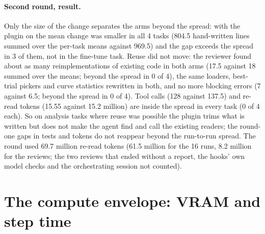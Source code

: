 \documentclass[11pt]{article}
\begin{document}
\paragraph{Second round, result.} Only the size of the change separates the arms beyond the spread: with the plugin on
the mean change was smaller in all 4 tasks (804.5 hand-written lines summed over the per-task means against 969.5) and
the gap exceeds the spread in 3 of them, not in the fine-tune task. Reuse did not move: the reviewer found about as many
reimplementations of existing code in both arms (17.5 against 18 summed over the means; beyond the spread in 0 of 4),
the same loaders, best-trial pickers and curve statistics rewritten in both, and no more blocking errors (7 against
6.5; beyond the spread in 0 of 4). Tool calls (128 against 137.5) and re-read tokens (15.55 against 15.2 million) are
inside the spread in every task (0 of 4 each). So on analysis tasks where reuse was possible the plugin trims what is
written but does not make the agent find and call the existing readers; the round-one gaps in tests and tokens do not
reappear beyond the run-to-run spread. The round used 69.7 million re-read tokens (61.5 million for the 16 runs, 8.2
million for the reviews; the two reviews that ended without a report, the hooks' own model checks and the
orchestrating session not counted).

\section{The compute envelope: VRAM and step time}\label{sec:envelope}
\end{document}
